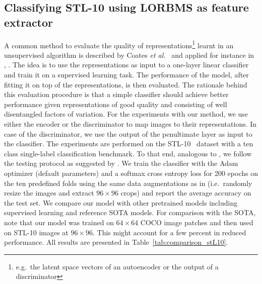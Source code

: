 \documentclass[a4paper,12pt]{report}
\begin{document}
\subsection{Classifying STL-10 using LORBMS as feature extractor}\label{subsec:linearclassifier}
A common method to evaluate the quality of representations\footnote{e.g.\ the latent space vectors of an autoencoder or the output of a discriminator} learnt in an unsupervised algorithm is described by Coates \textit{et al.}~\cite{singleLayerNetworks} and applied for instance in \cite{DCGAN}, \cite{AE_Interp}. The idea is to use the representations as input to a one-layer linear classifier and train it on a supervised learning task. The performance of the model, after fitting it on top of the representations, is then evaluated. The rationale behind this evaluation procedure is that a simple classifier should achieve better performance given representations of good quality and consisting of well disentangled factors of variation. For the experiments with our method, we use either the encoder or the discriminator to map images to their representations. In case of the discriminator, we use the output of the penultimate layer as input to the classifier. The experiments are performed on the STL-10~\cite{singleLayerNetworks} dataset with a ten class single-label classification benchmark. To that end, analogous to \cite{SpotArtifacts}, we follow the testing protocol as suggested by \cite{singleLayerNetworks}. We train the classifier with the Adam~\cite{AdamOptim} optimizer (default parameters) and a softmax cross entropy loss for 200 epochs on the ten predefined folds using the same data augmentations as in \cite{SpotArtifacts} (i.e.\ randomly resize the images and extract $96 \times 96$ crops) and report the average accuracy on the test set. We compare our model with other pretrained models including supervised learning and reference SOTA models. For comparison with the SOTA, note that our model was trained on $64 \times 64$ COCO image patches and then used on STL-10 images at $96 \times 96$. This might account for a few percent in reduced performance. All results are presented in Table~\ref{tab:comparison_stL10}.

\end{document}
